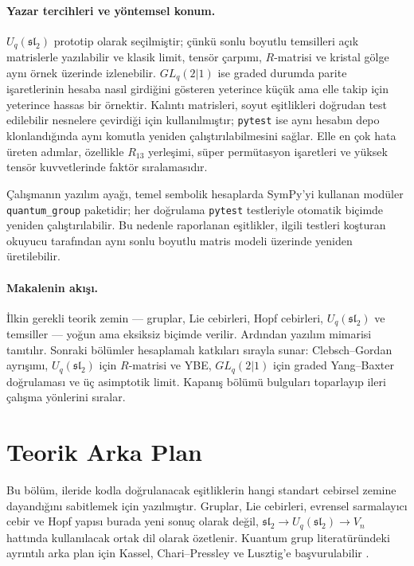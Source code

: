 \documentclass[10pt]{math}
\numberwithin{equation}{section}
\theoremstyle{plain}
\theoremstyle{definition}
\renewcommand{\sl}{\mathfrak{sl}}
\newcommand{\Uq}{U_q(\sl_2)}
\begin{document}
\paragraph{Yazar tercihleri ve yöntemsel konum.} $\Uq$ prototip olarak
seçilmiştir; çünkü sonlu boyutlu temsilleri açık matrislerle yazılabilir ve
klasik limit, tensör çarpımı, $R$-matrisi ve kristal gölge aynı örnek üzerinde
izlenebilir. $GL_q(2|1)$ ise graded durumda parite işaretlerinin hesaba nasıl
girdiğini gösteren yeterince küçük ama elle takip için yeterince hassas bir
örnektir. Kalıntı matrisleri, soyut eşitlikleri doğrudan test edilebilir
nesnelere çevirdiği için kullanılmıştır; \texttt{pytest} ise aynı hesabın depo
klonlandığında aynı komutla yeniden çalıştırılabilmesini sağlar. Elle en çok
hata üreten adımlar, özellikle $R_{13}$ yerleşimi, süper permütasyon işaretleri
ve yüksek tensör kuvvetlerinde faktör sıralamasıdır.

Çalışmanın yazılım ayağı, temel sembolik hesaplarda SymPy'yi kullanan modüler
\texttt{quantum\_group} paketidir; her doğrulama \texttt{pytest} testleriyle
otomatik biçimde yeniden çalıştırılabilir. Bu nedenle raporlanan eşitlikler,
ilgili testleri koşturan okuyucu tarafından aynı sonlu boyutlu matris modeli
üzerinde yeniden üretilebilir.

\paragraph{Makalenin akışı.} İlkin gerekli teorik zemin --- gruplar, Lie
cebirleri, Hopf cebirleri, $\Uq$ ve temsiller --- yoğun ama eksiksiz biçimde
verilir. Ardından yazılım mimarisi tanıtılır. Sonraki bölümler hesaplamalı
katkıları sırayla sunar: Clebsch--Gordan ayrışımı, $\Uq$ için $R$-matrisi ve
YBE, $GL_q(2|1)$ için graded Yang--Baxter doğrulaması ve üç asimptotik limit.
Kapanış bölümü bulguları toparlayıp ileri çalışma yönlerini sıralar.

\section{Teorik Arka Plan}

Bu bölüm, ileride kodla doğrulanacak eşitliklerin hangi standart cebirsel
zemine dayandığını sabitlemek için yazılmıştır. Gruplar, Lie cebirleri,
evrensel sarmalayıcı cebir ve Hopf yapısı burada yeni sonuç olarak değil,
$\sl_2 \to \Uq \to V_n$ hattında kullanılacak ortak dil olarak özetlenir.
Kuantum grup literatüründeki ayrıntılı arka plan için Kassel, Chari--Pressley
ve Lusztig'e başvurulabilir \cite{Kassel,ChariPressley,Lusztig}.
\end{document}
